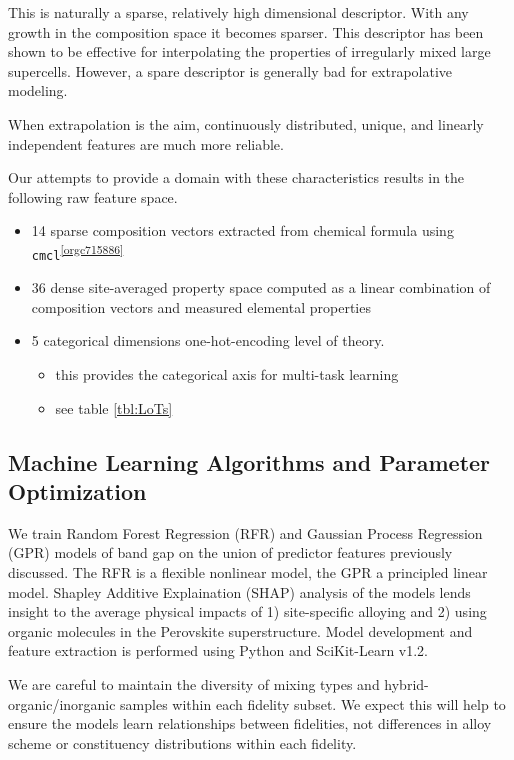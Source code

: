 This is naturally a sparse, relatively high dimensional descriptor.
With any growth in the composition space it becomes sparser.
This descriptor has been shown to be effective for interpolating the properties of irregularly mixed large supercells.
\autocite{mannodi-kanakkithodi-2022-data-driven}
However, a spare descriptor is generally bad for extrapolative modeling.
\autocite{ghiringhelli-2015-big-data} 

When extrapolation is the aim, continuously distributed, unique, and linearly independent features are much more reliable.
\autocite{lux-2020-inter-spars} 

Our attempts to provide a domain with these characteristics results in the following raw feature space.

\begin{itemize}
\item 14 sparse composition vectors extracted from chemical formula using \texttt{cmcl}\textsuperscript{\ref{orgc715886}}
\item 36 dense site-averaged property space computed as a linear combination of composition vectors and measured elemental properties \autocite{mentel-2014}
\item 5 categorical dimensions one-hot-encoding level of theory.
\begin{itemize}
\item this provides the categorical axis for multi-task learning
\item see table \ref{tbl:LoTs}
\end{itemize}
\end{itemize}

\subsection{Machine Learning Algorithms and Parameter Optimization}
\label{sec:orgea9409e}
We train Random Forest Regression (RFR) and Gaussian Process Regression (GPR) models of band gap on the union of predictor features previously discussed.
The RFR is a flexible nonlinear model, the GPR a principled linear model.
Shapley Additive Explaination (SHAP) analysis of the models lends insight to the average physical impacts of 1) site-specific alloying and 2) using organic molecules in the Perovskite superstructure.
 Model development and feature extraction is performed using Python and SciKit-Learn v1.2.
\autocite{pedregosa-2011-scikit-learn} 

We are careful to maintain the diversity of mixing types and hybrid-organic/inorganic samples within each fidelity subset.
We expect this will help to ensure the models learn relationships between fidelities, not differences in alloy scheme or constituency distributions within each fidelity.

